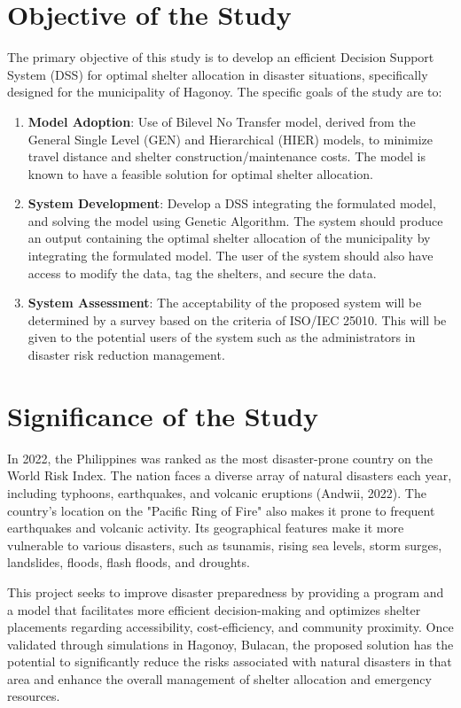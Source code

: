 \section{Objective of the Study}
	The primary objective of this study is to develop an efficient Decision Support System (DSS) for optimal shelter allocation in disaster situations, specifically designed for the municipality of Hagonoy. The specific goals of the study are to:
	
	\begin{enumerate}
		\item \textbf{Model Adoption}: Use of Bilevel No Transfer model, derived from the General Single Level (GEN) and Hierarchical (HIER) models, to minimize travel distance and shelter construction/maintenance costs. The model is known to have a feasible solution for optimal shelter allocation.
		
		\item \textbf{System Development}: Develop a DSS integrating the formulated model, and solving the model using Genetic Algorithm. The system should produce an output containing the optimal shelter allocation of the municipality by integrating the formulated model. The user of the system should also have access to modify the data, tag the shelters, and secure the data.
		
		\item \textbf{System Assessment}: The acceptability of the proposed system will be determined by a survey based on the criteria of ISO/IEC 25010. This will be given to the potential users of the system such as the administrators in disaster risk reduction management.
		
	\end{enumerate}

\section{Significance of the Study}
	In 2022, the Philippines was ranked as the most disaster-prone country on the World Risk Index. The nation faces a diverse array of natural disasters each year, including typhoons, earthquakes, and volcanic eruptions (Andwii, 2022). The country's location on the "Pacific Ring of Fire" also makes it prone to frequent earthquakes and volcanic activity. Its geographical features make it more vulnerable to various disasters, such as tsunamis, rising sea levels, storm surges, landslides, floods, flash floods, and droughts.
	
	This project seeks to improve disaster preparedness by providing a program and a model that facilitates more efficient decision-making and optimizes shelter placements regarding accessibility, cost-efficiency, and community proximity. Once validated through simulations in Hagonoy, Bulacan, the proposed solution has the potential to significantly reduce the risks associated with natural disasters in that area and enhance the overall management of shelter allocation and emergency resources.
	
